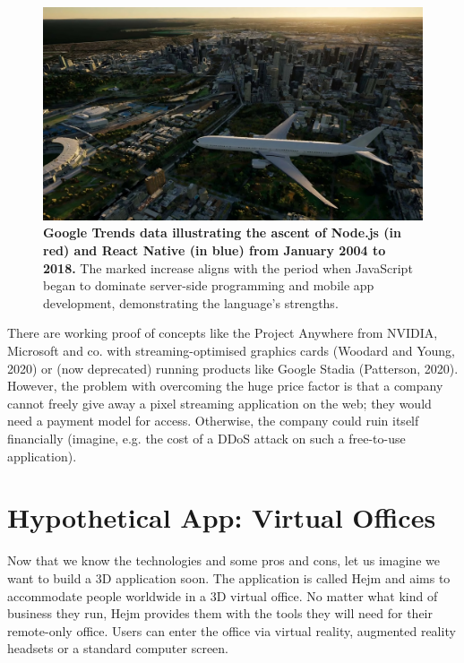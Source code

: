 \documentclass[10pt]{article}
\begin{document}
\begin{sloppypar}
  \begin{figure}[ht]
    \centering
    \includegraphics[width=\textwidth]{figures/project-anywhere.jpg}
    \caption[Google Trends data illustrating the ascent of Node.js and React Native.]{\textbf{Google Trends data illustrating the ascent of Node.js (in red) and React Native (in blue) from January 2004 to 2018.} The marked increase aligns with the period when JavaScript began to dominate server-side programming and mobile app development, demonstrating the language’s strengths.}
    \label{fig:project-anywhere}
  \end{figure}

  There are working proof of concepts like the Project Anywhere from NVIDIA, Microsoft and co. with streaming-optimised graphics cards (Woodard and Young, 2020) or (now deprecated) running products like Google Stadia (Patterson, 2020). However, the problem with overcoming the huge price factor is that a company cannot freely give away a pixel streaming application on the web; they would need a payment model for access. Otherwise, the company could ruin itself financially (imagine, e.g. the cost of a DDoS attack on such a free-to-use application).

  \section{Hypothetical App: Virtual Offices}
  \label{sec:hypothetical-app-virtual-offices}

  Now that we know the technologies and some pros and cons, let us imagine we want to build a 3D application soon. The application is called Hejm and aims to accommodate people worldwide in a 3D virtual office. No matter what kind of business they run, Hejm provides them with the tools they will need for their remote-only office. Users can enter the office via virtual reality, augmented reality headsets or a standard computer screen.


\end{sloppypar}
\end{document}
